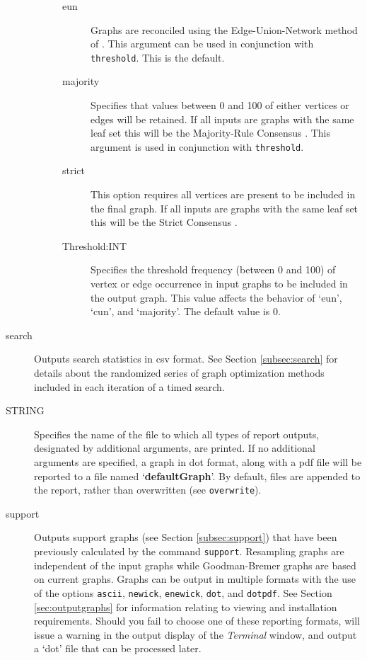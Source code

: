 \begin{description}
\begin{description}
\begin{description}
				\item[eun] Graphs are reconciled using the Edge-Union-Network method of 
				\citep{MiyagiandWheeler2019}. This argument can be used in conjunction with 
				\texttt{threshold}. This is the default.
				
				\item[majority] Specifies that values between 0 and 100 of either vertices or 
				edges will be retained. If all inputs are graphs with the same leaf set this will 
				be the Majority-Rule Consensus \citep{MargushandMcMorris1981}. This
				argument is used in conjunction with \texttt{threshold}.

				\item[strict] This option requires all vertices are present to be included in the 
				final graph. If all inputs are graphs with the same leaf set this will be the Strict 
				Consensus \citep{Schuhandpolhemus1980}. 
				
				\item [Threshold:INT] Specifies the threshold frequency (between 0 and 100) 
				of vertex or edge occurrence in input graphs to be included in the output graph. 
				This value affects the behavior of `eun', `cun', and `majority'. The 
				default value is $0$.
				
			\end{description}
				
		\end{description}	
				
		\item[search] Outputs search statistics in csv format. See Section 
		\ref{subsec:search} for details about the randomized series of graph 
		optimization methods included in each iteration of a timed search.
			
		\item [STRING] Specifies the name of the file to which all types of report 
		outputs, designated by additional arguments, are printed. If no additional 
		arguments are specified, a graph in dot format, along with a pdf file will be 
		reported to a file named `\textbf{defaultGraph}'. By default, files are 
		appended to the report, rather than overwritten (see \texttt{overwrite}).
				
		\item[support] Outputs support graphs (see Section \ref{subsec:support})
		that have been previously calculated by the command \texttt{support}. 
		Resampling graphs \citep{Farrisetal1996} are independent of the input graphs 
		while Goodman-Bremer graphs \citep{Goodmanetal1982, bremer1994} are 
		based on current graphs. Graphs can be output in multiple formats with the
		use of the options \texttt{ascii}, \texttt{newick}, \texttt{enewick}, \texttt{dot}, 
		and \texttt{dotpdf}. See Section \ref{sec:outputgraphs} for information relating to 
		viewing and installation requirements. Should you fail to choose one of 
		these reporting formats, \phyg will issue a warning in the output display 
		of the \textit{Terminal} window, and output a `dot' file that can be processed 
		later.
		

\end{description}
